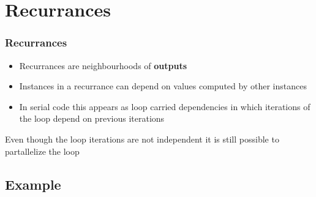 \documentclass{beamer}
\begin{document}
\section{Recurrances}
\begin{frame}
\frametitle{Recurrances}
    \begin{itemize}
      \item Recurrances are neighbourhoods of \textbf{outputs}
      \item Instances in a recurrance can depend on values computed by other instances
      \item In serial code this appears as loop carried dependencies in which iterations of the loop depend on previous iterations
    \end{itemize}
Even though the loop iterations are not independent it is still possible to partallelize the loop
\end{frame}
\subsection{Example}
\end{document}
